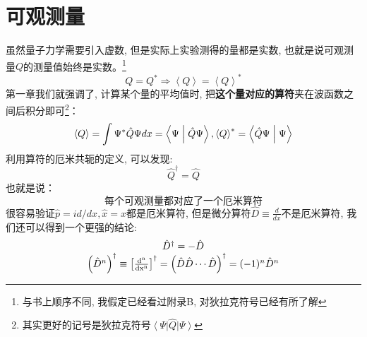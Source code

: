 \documentclass[a4paper,zihao=-4,linespread=1]{ctexrep}
\newenvironment{lequation}{\large\begin{equation}}{\end{equation}}
\begin{document}
    \section{可观测量}
    虽然量子力学需要引入虚数, 但是实际上实验测得的量都是实数, 也就是说可观测量$Q$的测量值始终是实数。\footnote{与书上顺序不同, 我假定已经看过附录B, 对狄拉克符号已经有所了解}
    \[Q = {Q^*} \Rightarrow \left\langle Q \right\rangle  = {\left\langle Q \right\rangle ^*}\]
    第一章我们就强调了, 计算某个量的平均值时, 把\textbf{这个量对应的算符}夹在波函数之间后积分即可\footnote{其实更好的记号是狄拉克符号$\left\langle \Psi  \right|\hat Q\left| \Psi  \right\rangle $}：
    \[\left\langle Q \right\rangle  = \int {{\Psi ^*}\hat Q\Psi dx}  = \left\langle {\Psi }\mathrel{\left | {\vphantom {\Psi  {\hat Q\Psi }}}\right. \kern-\nulldelimiterspace}
    {{\hat Q\Psi }} \right\rangle ,{\left\langle Q \right\rangle ^*} = \left\langle {{\hat Q\Psi }}\mathrel{\left | {\vphantom {{\hat Q\Psi } \Psi }}\right. \kern-\nulldelimiterspace}
    {\Psi } \right\rangle \]
    利用算符的厄米共轭的定义, 可以发现:
    \begin{equation}
        \boxed{
            \hat{Q}^\dagger=\hat{Q}
        }
    \end{equation}
    也就是说：
    \begin{equation}
        \boxed{
            \text{每个可观测量都对应了一个厄米算符}
        }
    \end{equation}
    很容易验证$\hat{p}=id/dx,\hat{x}=x$都是厄米算符, 但是微分算符$\hat{D}\equiv\frac{d}{dx}$不是厄米算符, 我们还可以得到一个更强的结论:
    \begin{lequation}
        \begin{array}{c}
            \hat{D}^\dagger = -\hat{D} \\ 
            \left(\hat{D}^n\right)^\dagger\equiv\left[\frac{\rm{d}^n}{\rm{d}x^n} \right]^\dagger=\left(\hat{D}\hat{D}\cdots\hat{D}\right)^\dagger=(-1)^n\hat{D}^n
        \end{array}
    \end{lequation}
\end{document}

